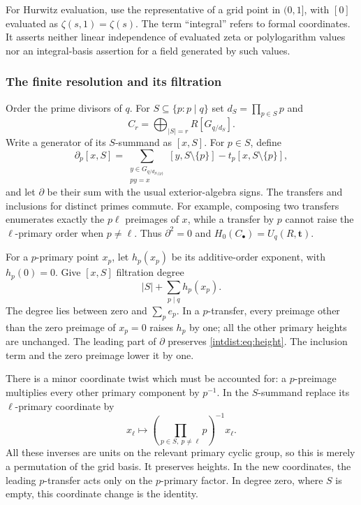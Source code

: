 \documentclass[11pt,a4paper]{article}
\numberwithin{equation}{section}
\theoremstyle{plain}
\theoremstyle{definition}
\theoremstyle{remark}
\begin{document}
For Hurwitz evaluation, use the representative of a grid point in
$(0,1]$, with $[0]$ evaluated as $\zeta(s,1)=\zeta(s)$.
The term ``integral'' refers to formal coordinates. It asserts neither
linear independence of evaluated zeta or polylogarithm values nor an
integral-basis assertion for a field generated by such values.

\subsubsection{The finite resolution and its filtration}

Order the prime divisors of $q$. For $S\subseteq\{p:p\mid q\}$ set
$d_S=\prod_{p\in S}p$ and
\[
 C_r=\bigoplus_{|S|=r}R[G_{q/d_S}].
\]
Write a generator of its $S$-summand as $[x,S]$. For $p\in S$, define
\[
 \partial_p[x,S]=
 \sum_{\substack{y\in G_{q/d_{S\setminus\{p\}}}\\py=x}}
          [y,S\setminus\{p\}]
 -t_p[x,S\setminus\{p\}],
\]
and let $\partial$ be their sum with the usual exterior-algebra signs.
The transfers and inclusions for distinct primes commute. For example,
composing two transfers enumerates exactly the $p\ell$ preimages of
$x$, while a transfer by $p$ cannot raise the $\ell$-primary order when
$p\ne\ell$. Thus $\partial^2=0$ and
$H_0(C_\bullet)=U_q(R,\mathbf t)$.

For a $p$-primary point $x_p$, let $h_p(x_p)$ be its additive-order
exponent, with $h_p(0)=0$. Give $[x,S]$ filtration degree
\begin{equation}\label{intdist:eq:height}
 |S|+\sum_{p\mid q}h_p(x_p).
\end{equation}
The degree lies between zero and $\sum_pe_p$. In a $p$-transfer, every
preimage other than the zero preimage of $x_p=0$ raises $h_p$ by one;
all the other primary heights are unchanged. The leading part of
$\partial$ preserves \eqref{intdist:eq:height}. The inclusion term and
the zero preimage lower it by one.

There is a minor coordinate twist which must be accounted for: a
$p$-preimage multiplies every other primary component by $p^{-1}$.
In the $S$-summand replace its $\ell$-primary coordinate by
\[
 x_\ell\longmapsto
 \left(\prod_{p\in S,\ p\ne\ell}p\right)^{-1}x_\ell.
\]
All these inverses are units on the relevant primary cyclic group, so
this is merely a permutation of the grid basis. It preserves heights.
In the new coordinates, the leading $p$-transfer acts only on the
$p$-primary factor. In degree zero, where $S$ is empty, this coordinate
change is the identity.
\end{document}
